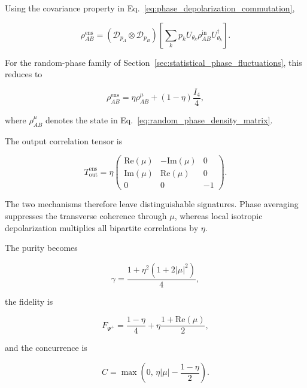 Using the covariance property in
Eq.~\eqref{eq:phase_depolarization_commutation},

\begin{equation}
\rho_{AB}^{\mathrm{ens}}
=
\left(
\mathcal{D}_{p_A}
\otimes
\mathcal{D}_{p_B}
\right)
\left[
\sum_k
p_k
U_{\theta_k}
\rho_{AB}^{\mathrm{in}}
U_{\theta_k}^\dagger
\right].
\label{eq:statistical_composite_reordered}
\end{equation}

For the random-phase family of Section~\ref{sec:statistical_phase_fluctuations},
this reduces to

\begin{equation}
\rho_{AB}^{\mathrm{ens}}
=
\eta
\rho_{AB}^{\mu}
+
(1-\eta)
\frac{I_4}{4},
\label{eq:statistical_composite_density_compact}
\end{equation}

where \( \rho_{AB}^{\mu} \) denotes the state in
Eq.~\eqref{eq:random_phase_density_matrix}.

The output correlation tensor is

\begin{equation}
T_{\mathrm{out}}^{\mathrm{ens}}
=
\eta
\begin{pmatrix}
\mathrm{Re}(\mu) & -\mathrm{Im}(\mu) & 0\\
\mathrm{Im}(\mu) & \mathrm{Re}(\mu) & 0\\
0 & 0 & -1
\end{pmatrix}.
\label{eq:statistical_composite_tensor}
\end{equation}

The two mechanisms therefore leave distinguishable signatures. Phase averaging
suppresses the transverse coherence through \( \mu \), whereas local isotropic
depolarization multiplies all bipartite correlations by \( \eta \).

The purity becomes

\begin{equation}
\gamma
=
\frac{
1+\eta^2
\left(
1+2|\mu|^2
\right)
}{4},
\label{eq:statistical_composite_purity}
\end{equation}

the fidelity is

\begin{equation}
F_{\Psi^+}
=
\frac{1-\eta}{4}
+
\eta
\frac{
1+\mathrm{Re}(\mu)
}{2},
\label{eq:statistical_composite_fidelity}
\end{equation}

and the concurrence is

\begin{equation}
C
=
\max
\left(
0,\,
\eta|\mu|
-
\frac{1-\eta}{2}
\right).
\label{eq:statistical_composite_concurrence}
\end{equation}

